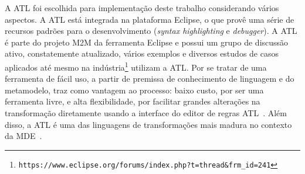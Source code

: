 A ATL foi escolhida para implementação deste trabalho considerando vários aspectos. A ATL está integrada na plataforma Eclipse, o que provê uma série de recursos padrões para o desenvolvimento (\textit{syntax highlighting} e \textit{debugger}). A ATL é parte do projeto M2M da ferramenta Eclipse e possui um grupo de discussão ativo, constatemente atualizado, vários exemplos e diversos estudos de casos aplicados até mesmo na indústria\footnote{\texttt{\texttt{https://www.eclipse.org/forums/index.php?t=thread&frm_id=241}}} utilizam a ATL. Por se tratar de uma ferramenta de fácil uso, a partir de premissa de conhecimento de linguagem e do metamodelo, traz como vantagem ao processo: baixo custo, por ser uma ferramenta livre, e alta flexibilidade, por facilitar grandes alterações na transformação diretamente usando a interface do editor de regras ATL~\cite{Salem_2008}. Além disso, a ATL é uma das linguagens de transformações mais madura no contexto da MDE~\cite{bruneliere_2010}.



































